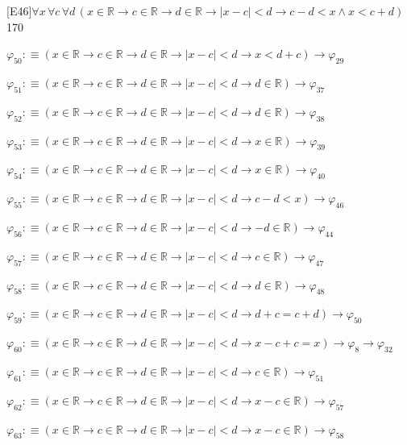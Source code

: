 \begin{fullproof}{[E46]}{$\forall x\,\forall c\,\forall d\,(x \in \mathbb{R} \to c \in \mathbb{R} \to d \in \mathbb{R} \to \lvert x - c \rvert < d \to c - d < x \land x < c + d)$}{170}
\begin{abbrevlist}
\item $\varphi_{50} :\equiv (x \in \mathbb{R} \to c \in \mathbb{R} \to d \in \mathbb{R} \to \lvert x - c \rvert < d \to x < d + c) \to \varphi_{29}$
\item $\varphi_{51} :\equiv (x \in \mathbb{R} \to c \in \mathbb{R} \to d \in \mathbb{R} \to \lvert x - c \rvert < d \to d \in \mathbb{R}) \to \varphi_{37}$
\item $\varphi_{52} :\equiv (x \in \mathbb{R} \to c \in \mathbb{R} \to d \in \mathbb{R} \to \lvert x - c \rvert < d \to d \in \mathbb{R}) \to \varphi_{38}$
\item $\varphi_{53} :\equiv (x \in \mathbb{R} \to c \in \mathbb{R} \to d \in \mathbb{R} \to \lvert x - c \rvert < d \to x \in \mathbb{R}) \to \varphi_{39}$
\item $\varphi_{54} :\equiv (x \in \mathbb{R} \to c \in \mathbb{R} \to d \in \mathbb{R} \to \lvert x - c \rvert < d \to x \in \mathbb{R}) \to \varphi_{40}$
\item $\varphi_{55} :\equiv (x \in \mathbb{R} \to c \in \mathbb{R} \to d \in \mathbb{R} \to \lvert x - c \rvert < d \to c - d < x) \to \varphi_{46}$
\item $\varphi_{56} :\equiv (x \in \mathbb{R} \to c \in \mathbb{R} \to d \in \mathbb{R} \to \lvert x - c \rvert < d \to -d \in \mathbb{R}) \to \varphi_{44}$
\item $\varphi_{57} :\equiv (x \in \mathbb{R} \to c \in \mathbb{R} \to d \in \mathbb{R} \to \lvert x - c \rvert < d \to c \in \mathbb{R}) \to \varphi_{47}$
\item $\varphi_{58} :\equiv (x \in \mathbb{R} \to c \in \mathbb{R} \to d \in \mathbb{R} \to \lvert x - c \rvert < d \to d \in \mathbb{R}) \to \varphi_{48}$
\item $\varphi_{59} :\equiv (x \in \mathbb{R} \to c \in \mathbb{R} \to d \in \mathbb{R} \to \lvert x - c \rvert < d \to d + c = c + d) \to \varphi_{50}$
\item $\varphi_{60} :\equiv (x \in \mathbb{R} \to c \in \mathbb{R} \to d \in \mathbb{R} \to \lvert x - c \rvert < d \to x - c + c = x) \to \varphi_{8} \to \varphi_{32}$
\item $\varphi_{61} :\equiv (x \in \mathbb{R} \to c \in \mathbb{R} \to d \in \mathbb{R} \to \lvert x - c \rvert < d \to c \in \mathbb{R}) \to \varphi_{51}$
\item $\varphi_{62} :\equiv (x \in \mathbb{R} \to c \in \mathbb{R} \to d \in \mathbb{R} \to \lvert x - c \rvert < d \to x - c \in \mathbb{R}) \to \varphi_{57}$
\item $\varphi_{63} :\equiv (x \in \mathbb{R} \to c \in \mathbb{R} \to d \in \mathbb{R} \to \lvert x - c \rvert < d \to x - c \in \mathbb{R}) \to \varphi_{58}$

\end{abbrevlist}
\end{fullproof}

